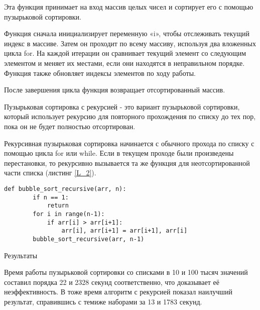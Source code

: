 \documentclass[oneside,14pt]{extarticle} %
\begin{document}
	Эта функция принимает на вход массив целых чисел и сортирует его с помощью пузырьковой сортировки.
		
	Функция сначала инициализирует переменную «i», чтобы отслеживать текущий индекс в массиве. Затем он проходит по всему массиву, используя два вложенных цикла for. На каждой итерации он сравнивает текущий элемент со следующим элементом и меняет их местами, если они находятся в неправильном порядке. Функция также обновляет индексы элементов по ходу работы.
		
	После завершения цикла функция возвращает отсортированный массив.
	
	
	Пузырьковая сортировка с рекурсией - это вариант пузырьковой сортировки, который использует рекурсию для повторного прохождения по списку до тех пор, пока он не будет полностью отсортирован.
	
	Рекурсивная пузырьковая сортировка начинается с обычного прохода по списку с помощью цикла for или while. Если в текущем проходе были произведены перестановки, то рекурсивно вызывается та же функция для неотсортированной части списка (листинг \ref{L_2}).
	
	\begin{lstlisting}[caption={Алгоритм рекурсивной пузырьковой сортировки}]
	def bubble_sort_recursive(arr, n):
		if n == 1:
			return
		for i in range(n-1):
			if arr[i] > arr[i+1]:
				arr[i], arr[i+1] = arr[i+1], arr[i]
		bubble_sort_recursive(arr, n-1)
	\end{lstlisting}\label{L_2}
	
	\begin{center}
		Результаты
	\end{center}
		
	Время работы пузырьковой сортировки со списками в 10 и 100 тысяч значений составил порядка 22 и 2328 секунд соответственно, что доказывает её неэффективность. 
	В тоже время алгоритм с рекурсией показал наилучший результат, справившись с темиже наборами за 13 и 1783 секунд.
	
\end{document}
